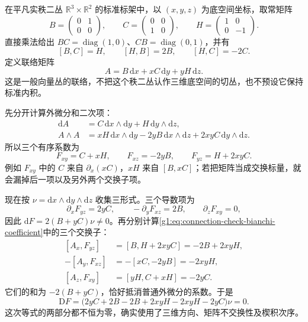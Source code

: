 \begin{example}\label{g1:exm:connection-check-nonabelian}
	在平凡实秩二丛 \(\mathbb R^3\times\mathbb R^2\) 的标准标架中，以 \((x,y,z)\) 为底空间坐标，取常矩阵
	\[
		B=\begin{pmatrix}0&1\\0&0\end{pmatrix},\qquad
		C=\begin{pmatrix}0&0\\1&0\end{pmatrix},\qquad
		H=\begin{pmatrix}1&0\\0&-1\end{pmatrix}.
	\]
	直接乘法给出 \(BC=\operatorname{diag}(1,0)\)、\(CB=\operatorname{diag}(0,1)\)，并有
	\[
		[B,C]=H,\qquad [H,B]=2B,\qquad [H,C]=-2C.
	\]
	定义联络矩阵
	\[
		A=B\,\mathrm{d}x+xC\,\mathrm{d}y+yH\,\mathrm{d}z.
	\]
	这是一般向量丛的联络，不把这个秩二丛认作三维底空间的切丛，也不预设它保持标准内积。

	先分开计算外微分和二次项：
	\[
		\begin{aligned}
			\mathrm{d}A&=C\,\mathrm{d}x\wedge\mathrm{d}y
			+H\,\mathrm{d}y\wedge\mathrm{d}z,\\
			A\wedge A&=xH\,\mathrm{d}x\wedge\mathrm{d}y
			-2yB\,\mathrm{d}x\wedge\mathrm{d}z
			+2xyC\,\mathrm{d}y\wedge\mathrm{d}z.
		\end{aligned}
	\]
	所以三个有序系数为
	\begin{equation}\label{g1:eq:connection-check-three-curvatures}
		F_{xy}=C+xH,\qquad F_{xz}=-2yB,\qquad F_{yz}=H+2xyC.
	\end{equation}
	例如 \(F_{xy}\) 中的 \(C\) 来自 \(\partial_x(xC)\)，\(xH\) 来自 \([B,xC]\)；若把矩阵当成交换标量，就会漏掉后一项以及另外两个交换子项。

	现在按 \(\nu=\mathrm{d}x\wedge\mathrm{d}y\wedge\mathrm{d}z\) 收集三形式。三个导数项为
	\[
		\partial_xF_{yz}=2yC,\qquad
		-\partial_yF_{xz}=2B,\qquad
		\partial_zF_{xy}=0,
	\]
	因此 \(\mathrm{d}F=2(B+yC)\nu\ne0\)。再分别计算\eqref{g1:eq:connection-check-bianchi-coefficient}中的三个交换子：
	\[
		\begin{aligned}
			[A_x,F_{yz}]&=[B,H+2xyC]=-2B+2xyH,\\
			-[A_y,F_{xz}]&=-[xC,-2yB]=-2xyH,\\
			[A_z,F_{xy}]&=[yH,C+xH]=-2yC.
		\end{aligned}
	\]
	它们的和为 \(-2(B+yC)\)，恰好抵消普通外微分的系数。于是
	\[
		\mathrm{D}F
		=\bigl(2yC+2B-2B+2xyH-2xyH-2yC\bigr)\nu=0.
	\]
	这次等式的两部分都不恒为零，确实使用了三维方向、矩阵不交换性及楔积次序。
\end{example}

